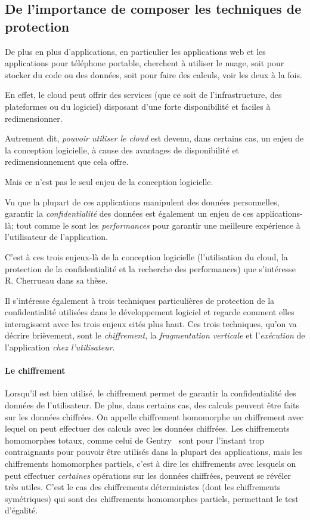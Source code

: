 \subsection{De l'importance de composer les techniques de protection}
\label{fautComposer}

De plus en plus d'applications, en particulier
les applications web et les applications pour téléphone portable,
cherchent à utiliser le nuage, soit pour stocker du code ou des données, 
soit pour faire des calculs,
voir les deux à la fois.

En effet, le cloud peut offrir des services (que ce soit de l'infrastructure,
des plateformes ou du logiciel) disposant d'une forte disponibilité et faciles à redimensionner.

Autrement dit, \emph{pouvoir utiliser le cloud} 
est devenu, dans certains cas,
un enjeu de la conception logicielle,
à cause des avantages de disponibilité 
et redimensionnement que cela offre.

Mais ce n'est pas le seul enjeu de la conception
logicielle.

Vu que la plupart de ces applications manipulent 
des données personnelles, 
garantir la \emph{confidentialité} des données 
est également un enjeu de 
ces applications-là; 
tout comme le sont les \emph{performances} 
pour garantir
une meilleure expérience à l'utilisateur de l'application.

C'est à ces trois enjeux-là de la conception
logicielle (l'utilisation du cloud,
la protection de la confidentialité
et la recherche des performances)
que s'intéresse R. Cherrueau dans sa thèse.

Il s'intéresse également à trois techniques
particulières de protection de la confidentialité
utilisées dans le développement logiciel et regarde comment elles interagissent
avec les trois enjeux cités plus haut.
Ces trois techniques, qu'on va décrire brièvement, sont
	le \emph{chiffrement},
	la \emph{fragmentation verticale} et
	l'\emph{exécution} de l'application \emph{chez l'utilisateur}.

\paragraph{Le chiffrement}
Lorsqu'il est bien utilisé, le chiffrement permet de garantir la confidentialité
des données de l'utilisateur.
De plus, dans certains cas, des calculs peuvent être faits sur les données chiffrées.
On appelle chiffrement homomorphe un chiffrement avec lequel on peut effectuer des calculs
avec les données chiffrées. Les chiffrements homomorphes totaux, comme celui de
Gentry~\cite{gentry:total} sont pour l'instant trop contraignants pour pouvoir être utilisés
dans la plupart des applications, mais les chiffrements homomorphes partiels,
c'est à dire les chiffrements avec lesquels on peut effectuer \emph{certaines}
opérations sur les données chiffrées, peuvent se révéler très utiles.
C'est le cas des chiffrements déterministes (dont les chiffrements symétriques)
qui sont des chiffrements homomorphes partiels, permettant le test d'égalité.

